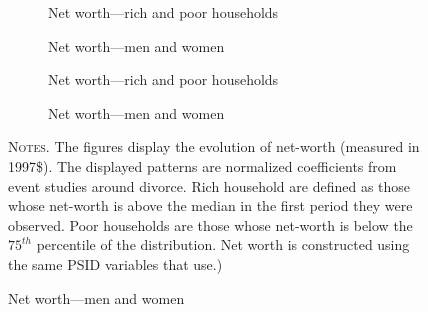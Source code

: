 \documentclass[12pt]{article}
\numberwithin{table}{section}
\begin{document}
\begin{figure}[ht]
\caption{\\ Event studies of net-worth around divorce}
\label{fig:assdiv}


\begin{subfigure}{.49\textwidth}
\centering
\caption{Net worth---rich and poor households}
\label{sf:assdiv1}
\scalebox{0.5}{ } 
\end{subfigure}
\begin{subfigure}{.49\textwidth}
\centering
\caption{Net worth---men and women}
\label{sf:assdiv2}
\scalebox{0.5}{ } 
\end{subfigure}

\hspace{20em}


\begin{subfigure}{.49\textwidth}
\centering
\caption{Net worth---rich and poor households}
\label{sf:assdiv3}
\scalebox{0.5}{ } 
\end{subfigure}
\begin{subfigure}{.49\textwidth}
\centering
\caption{Net worth---men and women}
\label{sf:assdiv4}
\scalebox{0.5}{ } 
\end{subfigure}






\begin{minipage}{0.99\textwidth} %

\hspace{50em}

{\footnotesize \textsc{Notes.} The figures display the evolution of net-worth (measured in 1997\$). The displayed patterns are normalized coefficients from event studies around divorce. Rich household are defined as those whose net-worth is above the median in the first period they were observed. Poor households are those whose net-worth is below the $75^{th}$ percentile of the distribution. Net worth is constructed using the same PSID variables that \cite{blundell2016} use.)\par}
\end{minipage}
\end{figure}
\FloatBarrier
\end{document}
